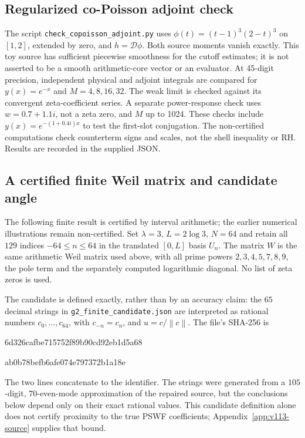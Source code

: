 \documentclass[11pt]{article}
\theoremstyle{remark}
\newcommand{\norm}[1]{\left\lVert #1\right\rVert}
\begin{document}
\subsection*{Regularized co-Poisson adjoint check}
The script \texttt{check\_copoisson\_adjoint.py} uses
$\phi(t)=(t-1)^3(2-t)^3$ on $[1,2]$, extended by zero, and
$h=\mathcal D\phi$. Both source moments vanish exactly. This toy
source has sufficient piecewise smoothness for the cutoff estimates;
it is not asserted to be a smooth arithmetic-core vector or an evaluator.
At 45-digit precision, independent physical and adjoint integrals are
compared for $y(x)=e^{-x}$ and $M=4,8,16,32$. The weak limit is checked
against its convergent zeta-coefficient series. A separate power-response
check uses $w=0.7+1.1i$, not a zeta zero, and $M$ up to 1024. These
checks include $y(x)=e^{-(1+0.4i)x}$ to test the first-slot conjugation.
The
non-certified computations check counterterm signs and scales, not
the shell inequality or RH. Results are recorded in the supplied JSON.

\subsection*{A certified finite Weil matrix and candidate angle}
\label{app:v112-certificate}
The following finite result is certified by interval arithmetic; the
earlier numerical illustrations remain non-certified. Set
$\lambda=3$, $L=2\log3$, $N=64$ and retain all $129$ indices
$-64\le n\le64$ in the translated $[0,L]$ basis $U_n$.
The matrix $W$ is the same arithmetic Weil matrix used above, with all
prime powers $2,3,4,5,7,8,9$, the pole term and the separately computed
logarithmic diagonal. No list of zeta zeros is used.

The candidate is defined exactly, rather than by an accuracy claim:
the $65$ decimal strings in \texttt{g2\_finite\_candidate.json} are
interpreted as rational numbers $c_0,\ldots,c_{64}$, with
$c_{-n}=c_n$, and $u=c/\norm c$. The file's SHA-256 is
\begin{center}\ttfamily\small
6d326cafbe715752f89b90cd92eb1d5a68\par
ab0b78befb6afe074e797372b1a18e
\end{center}
The two lines concatenate to the identifier. The strings were generated
from a $105$-digit, $70$-even-mode approximation of the repaired source,
but the conclusions below depend only on their exact rational values.
This candidate definition alone does not certify proximity to the true
PSWF coefficients; Appendix~\ref{app:v113-source} supplies that bound.
\end{document}
